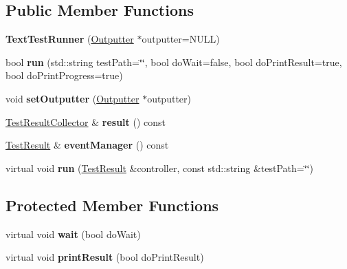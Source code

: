 \subsection*{Public Member Functions}
\begin{DoxyCompactItemize}
\item 
\hypertarget{class_text_test_runner_ac7b6cba645a3a5e76382fcd40e4f7eb6}{{\bfseries Text\-Test\-Runner} (\hyperlink{class_outputter}{Outputter} $\ast$outputter=N\-U\-L\-L)}\label{class_text_test_runner_ac7b6cba645a3a5e76382fcd40e4f7eb6}

\item 
\hypertarget{class_text_test_runner_ad9c38c263202c2bd453b927ba53dcf48}{bool {\bfseries run} (std\-::string test\-Path=\char`\"{}\char`\"{}, bool do\-Wait=false, bool do\-Print\-Result=true, bool do\-Print\-Progress=true)}\label{class_text_test_runner_ad9c38c263202c2bd453b927ba53dcf48}

\item 
\hypertarget{class_text_test_runner_a9d62d11f3acba355e47d21cb99106117}{void {\bfseries set\-Outputter} (\hyperlink{class_outputter}{Outputter} $\ast$outputter)}\label{class_text_test_runner_a9d62d11f3acba355e47d21cb99106117}

\item 
\hypertarget{class_text_test_runner_a7a6cf866d23d621ed35474c8179b9b48}{\hyperlink{class_test_result_collector}{Test\-Result\-Collector} \& {\bfseries result} () const }\label{class_text_test_runner_a7a6cf866d23d621ed35474c8179b9b48}

\item 
\hypertarget{class_text_test_runner_afa50f45ea60892db3cf0b128c06a1629}{\hyperlink{class_test_result}{Test\-Result} \& {\bfseries event\-Manager} () const }\label{class_text_test_runner_afa50f45ea60892db3cf0b128c06a1629}

\item 
\hypertarget{class_text_test_runner_a361eaa340138edf3659a9fcb813c3b5d}{virtual void {\bfseries run} (\hyperlink{class_test_result}{Test\-Result} \&controller, const std\-::string \&test\-Path=\char`\"{}\char`\"{})}\label{class_text_test_runner_a361eaa340138edf3659a9fcb813c3b5d}

\end{DoxyCompactItemize}
\subsection*{Protected Member Functions}
\begin{DoxyCompactItemize}
\item 
\hypertarget{class_text_test_runner_a5b192f9419f5d1e6ebe9abd4755da140}{virtual void {\bfseries wait} (bool do\-Wait)}\label{class_text_test_runner_a5b192f9419f5d1e6ebe9abd4755da140}

\item 
\hypertarget{class_text_test_runner_aa01e5dee4cdad860ee7154329918f9ac}{virtual void {\bfseries print\-Result} (bool do\-Print\-Result)}\label{class_text_test_runner_aa01e5dee4cdad860ee7154329918f9ac}

\end{DoxyCompactItemize}
